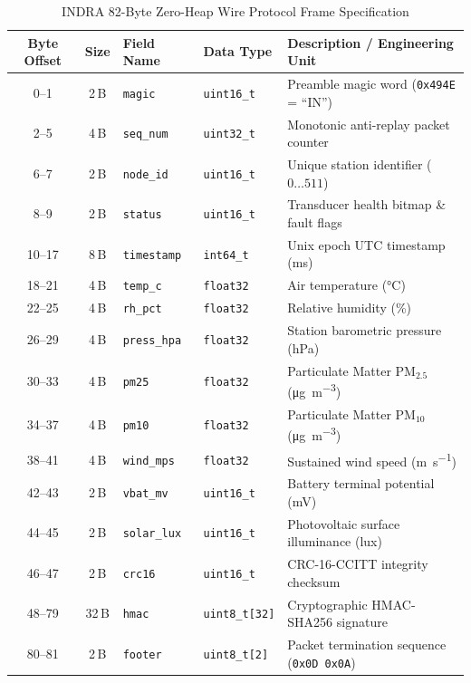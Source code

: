 \documentclass[journal,a4paper]{IEEEtran}
\begin{document}
\begin{table}[!htbp]
\caption{INDRA 82-Byte Zero-Heap Wire Protocol Frame Specification}
\label{tab:wire_protocol}
\centering
\footnotesize
\setlength{\tabcolsep}{3.5pt}
\begin{tabular}{@{}cclll@{}}
\toprule
Byte Offset & Size & Field Name & Data Type & Description / Engineering Unit \\
\midrule
0--1   & 2\,B  & \texttt{magic}       & \texttt{uint16\_t}  & Preamble magic word (\texttt{0x494E} = ``IN'') \\
2--5   & 4\,B  & \texttt{seq\_num}     & \texttt{uint32\_t}  & Monotonic anti-replay packet counter \\
6--7   & 2\,B  & \texttt{node\_id}     & \texttt{uint16\_t}  & Unique station identifier ($0 \ldots 511$) \\
8--9   & 2\,B  & \texttt{status}      & \texttt{uint16\_t}  & Transducer health bitmap \& fault flags \\
10--17 & 8\,B  & \texttt{timestamp}   & \texttt{int64\_t}   & Unix epoch UTC timestamp (\si{\milli\second}) \\
18--21 & 4\,B  & \texttt{temp\_c}     & \texttt{float32}    & Air temperature (\si{\celsius}) \\
22--25 & 4\,B  & \texttt{rh\_pct}     & \texttt{float32}    & Relative humidity (\si{\percent}) \\
26--29 & 4\,B  & \texttt{press\_hpa}  & \texttt{float32}    & Station barometric pressure (\si{hPa}) \\
30--33 & 4\,B  & \texttt{pm25}        & \texttt{float32}    & Particulate Matter $\text{PM}_{2.5}$ (\si{\micro\gram\per\cubic\metre}) \\
34--37 & 4\,B  & \texttt{pm10}        & \texttt{float32}    & Particulate Matter $\text{PM}_{10}$ (\si{\micro\gram\per\cubic\metre}) \\
38--41 & 4\,B  & \texttt{wind\_mps}   & \texttt{float32}    & Sustained wind speed (\si{\metre\per\second}) \\
42--43 & 2\,B  & \texttt{vbat\_mv}    & \texttt{uint16\_t}  & Battery terminal potential (\si{\milli\volt}) \\
44--45 & 2\,B  & \texttt{solar\_lux}  & \texttt{uint16\_t}  & Photovoltaic surface illuminance (\si{lux}) \\
46--47 & 2\,B  & \texttt{crc16}       & \texttt{uint16\_t}  & CRC-16-CCITT integrity checksum \\
48--79 & 32\,B & \texttt{hmac}        & \texttt{uint8\_t[32]}& Cryptographic HMAC-SHA256 signature \\
80--81 & 2\,B  & \texttt{footer}      & \texttt{uint8\_t[2]}& Packet termination sequence (\texttt{0x0D 0x0A}) \\
\bottomrule
\end{tabular}
\end{table}
\end{document}

